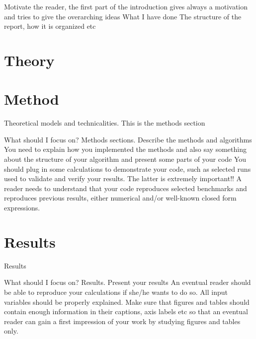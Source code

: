 \documentclass{article}
\begin{document}
Motivate the reader, the first part of the introduction gives always a motivation and tries to give the overarching ideas
What I have done
The structure of the report, how it is organized etc

\vspace{1cm}

\section{Theory} \label{sec:Theory}



\vspace{1cm}

\section{Method} \label{sec:Method}

Theoretical models and technicalities. This is the methods section


What should I focus on? Methods sections.
Describe the methods and algorithms
You need to explain how you implemented the methods and also say something about the structure of your algorithm and present some parts of your code
You should plug in some calculations to demonstrate your code, such as selected runs used to validate and verify your results. The latter is extremely important!! A reader needs to understand that your code reproduces selected benchmarks and reproduces previous results, either numerical and/or well-known closed form expressions.

\vspace{1cm}

\section{Results} \label{sec:Results}

Results

What should I focus on? Results.
Present your results
An eventual reader should be able to reproduce your calculations if she/he wants to do so. All input variables should be properly explained.
Make sure that figures and tables should contain enough information in their captions, axis labels etc so that an eventual reader can gain a first impression of your work by studying figures and tables only.
\end{document}
